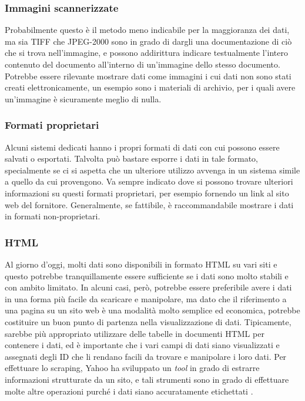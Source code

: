 \subsubsection{Immagini scannerizzate}
Probabilmente questo è il metodo meno indicabile per la maggioranza dei dati, ma sia TIFF che JPEG-2000 sono in grado di dargli una documentazione di ciò che si trova nell'immagine, e possono addirittura indicare testualmente l'intero contenuto del documento all'interno di un'immagine dello stesso documento. Potrebbe essere rilevante mostrare dati come immagini i cui dati non sono stati creati elettronicamente, un esempio sono i materiali di archivio, per i quali avere un'immagine è sicuramente meglio di nulla.
\subsubsection{Formati proprietari}
Alcuni sistemi dedicati hanno i propri formati di dati con cui possono essere salvati o esportati. Talvolta può bastare esporre i dati in tale formato, specialmente se ci si aspetta che un ulteriore utilizzo avvenga in un sistema simile a quello da cui provengono. Va sempre indicato dove si possono trovare ulteriori informazioni su questi formati proprietari, per esempio fornendo un link al sito web del fornitore. Generalmente, se fattibile, è raccommandabile mostrare i dati in formati non-proprietari.
\subsubsection{HTML}
Al giorno d'oggi, molti dati sono disponibili in formato HTML su vari siti e questo potrebbe tranquillamente essere sufficiente se i dati sono molto stabili e con ambito limitato. In alcuni casi, però, potrebbe essere preferibile avere i dati in una forma più facile da scaricare e manipolare, ma dato che il riferimento a una pagina su un sito web è una modalità molto semplice ed economica, potrebbe costituire un buon punto di partenza nella visualizzazione di dati. Tipicamente, sarebbe più appropriato utilizzare delle tabelle in documenti HTML per contenere i dati, ed è importante che i vari campi di dati siano visualizzati e assegnati degli ID che li rendano facili da trovare e manipolare i loro dati. Per effettuare lo scraping, Yahoo ha sviluppato un \textit{tool} in grado di estrarre informazioni strutturate da un sito, e tali strumenti sono in grado di effettuare molte altre operazioni purché i dati siano accuratamente etichettati \cite{YahooDevelopers_YQL}.
